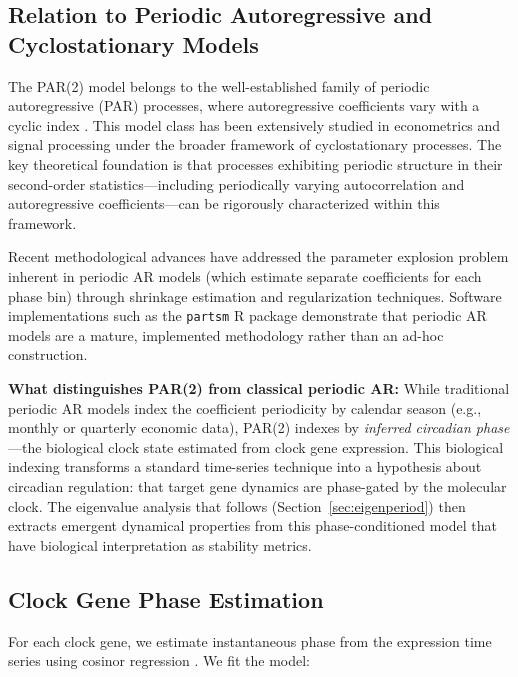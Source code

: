 \documentclass[11pt,a4paper]{article}
\begin{document}
\subsection{Relation to Periodic Autoregressive and Cyclostationary Models}

The PAR(2) model belongs to the well-established family of periodic autoregressive (PAR) processes, where autoregressive coefficients vary with a cyclic index \citep{box1979seasonal, hurd2007periodically}. This model class has been extensively studied in econometrics and signal processing under the broader framework of cyclostationary processes. The key theoretical foundation is that processes exhibiting periodic structure in their second-order statistics---including periodically varying autocorrelation and autoregressive coefficients---can be rigorously characterized within this framework.

Recent methodological advances have addressed the parameter explosion problem inherent in periodic AR models (which estimate separate coefficients for each phase bin) through shrinkage estimation \citep{paap2025shrinkage} and regularization techniques. Software implementations such as the \texttt{partsm} R package \citep{lopezdelacalle2005partsm} demonstrate that periodic AR models are a mature, implemented methodology rather than an ad-hoc construction.

\textbf{What distinguishes PAR(2) from classical periodic AR:} While traditional periodic AR models index the coefficient periodicity by calendar season (e.g., monthly or quarterly economic data), PAR(2) indexes by \textit{inferred circadian phase}---the biological clock state estimated from clock gene expression. This biological indexing transforms a standard time-series technique into a hypothesis about circadian regulation: that target gene dynamics are phase-gated by the molecular clock. The eigenvalue analysis that follows (Section~\ref{sec:eigenperiod}) then extracts emergent dynamical properties from this phase-conditioned model that have biological interpretation as stability metrics.

\subsection{Clock Gene Phase Estimation}

For each clock gene, we estimate instantaneous phase from the expression time series using cosinor regression \citep{cornelissen2014cosinor}. We fit the model:
\end{document}
